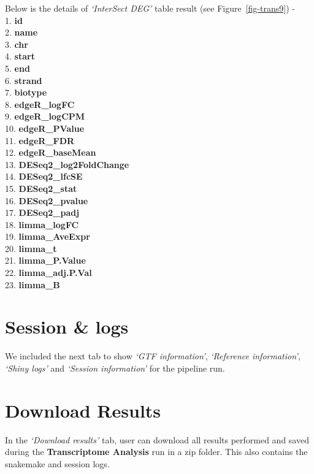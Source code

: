 \documentclass[
  a4paper,
  oneside,
  open=any]{scrreport}
\begin{document}
Below is the details of \emph{`InterSect DEG'} table result (see
Figure~\ref{fig-trans9}) -\\
1. \textbf{id}\\
2. \textbf{name}\\
3. \textbf{chr}\\
4. \textbf{start}\\
5. \textbf{end}\\
6. \textbf{strand}\\
7. \textbf{biotype}\\
8. \textbf{edgeR\_logFC}\\
9. \textbf{edgeR\_logCPM}\\
10. \textbf{edgeR\_PValue}\\
11. \textbf{edgeR\_FDR}\\
12. \textbf{edgeR\_baseMean}\\
13. \textbf{DESeq2\_log2FoldChange}\\
14. \textbf{DESeq2\_lfcSE}\\
15. \textbf{DESeq2\_stat}\\
16. \textbf{DESeq2\_pvalue}\\
17. \textbf{DESeq2\_padj}\\
18. \textbf{limma\_logFC}\\
19. \textbf{limma\_AveExpr}\\
20. \textbf{limma\_t}\\
21. \textbf{limma\_P.Value}\\
22. \textbf{limma\_adj.P.Val}\\
23. \textbf{limma\_B}

\hypertarget{session-logs}{%
\section{Session \& logs}\label{session-logs}}

We included the next tab to show \emph{`GTF information'},
\emph{`Reference information'}, \emph{`Shiny logs'} and \emph{`Session
information'} for the pipeline run.

\hypertarget{download-results}{%
\section{Download Results}\label{download-results}}

In the \emph{`Download results'} tab, user can download all results
performed and saved during the \textbf{Transcriptome Analysis} run in a
zip folder. This also contains the snakemake and session logs.
\end{document}
